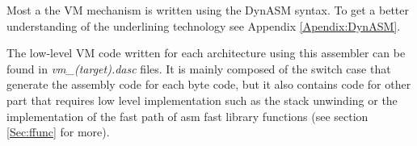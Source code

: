 Most a the VM mechanism is written using the DynASM syntax. To get a better
understanding of the underlining technology see Appendix \ref{Apendix:DynASM}.

The low-level VM code written for each architecture using this assembler can be
found in \emph{vm\_(target).dasc} files. It is mainly composed of the switch
case that generate the assembly code for each byte code, but it also contains
code for other part that requires low level implementation such as the
stack unwinding or the implementation of the fast path of asm fast library functions
(see section \ref{Sec:ffunc} for more).